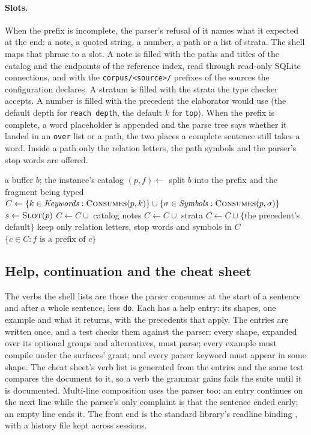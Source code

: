 \documentclass[11pt]{article}
\theoremstyle{plain}
\theoremstyle{definition}
\theoremstyle{remark}
\newcommand{\code}[1]{\texttt{#1}}
\begin{document}
\paragraph{Slots.} When the prefix is incomplete, the parser's refusal of it names what it
expected at the end: a note, a quoted string, a number, a path or a list of strata. The shell maps
that phrase to a slot. A note is filled with the paths and titles of the catalog and the endpoints
of the reference index, read through read-only SQLite connections, and with the
\code{corpus/<source>/} prefixes of the sources the configuration declares. A stratum is filled
with the strata the type checker accepts. A number is filled with the precedent the elaborator
would use (the default depth for \code{reach depth}, the default $k$ for \code{top}). When the
prefix is complete, a word placeholder is appended and the parse tree says whether it landed in
an \code{over} list or a path, the two places a complete sentence still takes a word. Inside a path
only the relation letters, the path symbols and the parser's stop words are offered.

\begin{algorithm}
\caption{Candidates for the word being typed.}
\begin{algorithmic}[1]
\Require a buffer $b$; the instance's catalog
\State $(p, f) \gets$ split $b$ into the prefix and the fragment being typed
\State $C \gets \{k \in \mathit{Keywords} : \textsc{Consumes}(p,k)\} \cup
       \{\sigma \in \mathit{Symbols} : \textsc{Consumes}(p,\sigma)\}$
\State $s \gets \textsc{Slot}(p)$ 
 $C \gets C \cup$ catalog notes
 $C \gets C \cup$ strata
 $C \gets C \cup \{$the precedent's default$\}$
 keep only relation letters, stop words and symbols in $C$
\EndIf
\State \Return $\{c \in C : f \text{ is a prefix of } c\}$
\end{algorithmic}
\end{algorithm}

\subsection{Help, continuation and the cheat sheet}
The verbs the shell lists are those the parser consumes at the start of a sentence and after a
whole sentence, less \code{do}. Each has a help entry: its shapes, one example and what it
returns, with the precedents that apply. The entries are written once, and a test checks them
against the parser: every shape, expanded over its optional groups and alternatives, must parse;
every example must compile under the surfaces' grant; and every parser keyword must appear in some
shape. The cheat sheet's verb list is generated from the entries and the same test compares the
document to it, so a verb the grammar gains fails the suite until it is documented. Multi-line
composition uses the parser too: an entry continues on the next line while the parser's only
complaint is that the sentence ended early; an empty line ends it. The front end is the standard
library's readline binding \cite{pythonreadline,readline}, with a history file kept across
sessions.
\end{document}
